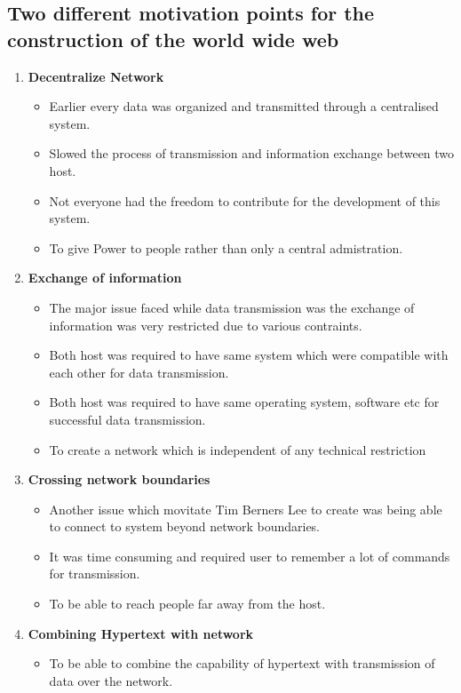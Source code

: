 \documentclass{resources/WeSTassignment}
\begin{document}
\subsection{Two different motivation points for the construction of the world wide web}
\begin{enumerate}
    \item \textbf{Decentralize Network}
	\begin{itemize}
    		\item Earlier every data was organized and transmitted through a centralised system.
		\item Slowed the process of transmission and information exchange between two host.
		\item Not everyone had the freedom to contribute for the development of this system.
		\item To give Power to people rather than only a central admistration.
	\end{itemize}
    \item \textbf{Exchange of information}
	\begin{itemize}
    		\item The major issue faced while data transmission was the exchange of information was very restricted due to various contraints.
		\item Both host was required to have same system which were compatible with each other for data transmission.
		\item Both host was required to have same operating system, software etc for successful data transmission.
		\item To create a network which is independent of any technical restriction
	\end{itemize}
    \item \textbf{Crossing network boundaries}
	\begin{itemize}
    		\item Another issue which movitate Tim Berners Lee to create was being able to connect to system beyond network boundaries.
		\item It was time consuming and required user to remember a lot of commands for transmission.
		\item To be able to reach people far away from the host.
	\end{itemize}
    \item \textbf{Combining Hypertext with network}
	\begin{itemize}
    		\item To be able to combine the capability of hypertext with transmission of data over the network.
	\end{itemize}
\end{enumerate}
\end{document}
